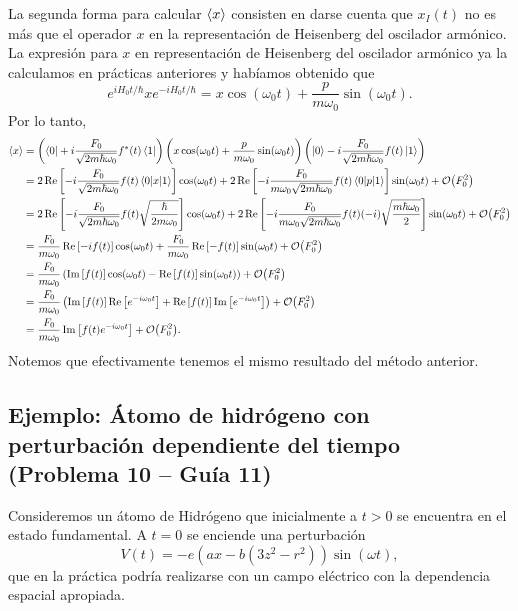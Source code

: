 \documentclass[10pt, a4paper]{article}
\numberwithin{equation}{subsection}
\begin{document}
\bigbreak

La segunda forma para calcular $\expval{x}$ consisten en darse cuenta que
$x_I(t)$ no es más que el operador $x$ en la representación de Heisenberg del
oscilador armónico. La expresión para $x$ en representación de Heisenberg del
oscilador armónico ya la calculamos en prácticas anteriores y habíamos obtenido
que
\begin{equation}
  e^{iH_0t/\hbar}xe^{-iH_0t/\hbar} = x\cos(\omega_0t) +
    \frac{p}{m\omega_0}\sin(\omega_0t).
\end{equation}
Por lo tanto,
\begin{align}
  \expval{x}
  &= \left(\bra{0} + i\frac{F_0}{\sqrt{2m\hbar\omega_0}}f^*(t)\bra{1}\right)
    \left(x\cos(\omega_0t) + \frac{p}{m\omega_0}\sin(\omega_0t)\right)
    \left(\ket{0} - i\frac{F_0}{\sqrt{2m\hbar\omega_0}}f(t)\ket{1}\right)
    \nonumber \\
  &= 2\Re\left[-i\frac{F_0}{\sqrt{2m\hbar\omega_0}}f(t)\matrixel{0}{x}{1}\right]\cos(\omega_0t) +
    2\Re\left[-i\frac{F_0}{m\omega_0\sqrt{2m\hbar\omega_0}}f(t)\matrixel{0}{p}{1}\right]\sin(\omega_0t) +
    \order{F_0^2} \nonumber \\
  &= 2\Re\left[-i\frac{F_0}{\sqrt{2m\hbar\omega_0}}f(t)\sqrt{\frac{\hbar}{2m\omega_0}}\right]\cos(\omega_0t) +
    2\Re\left[-i\frac{F_0}{m\omega_0\sqrt{2m\hbar\omega_0}}f(t)(-i)\sqrt{\frac{m\hbar\omega_0}{2}}\right]\sin(\omega_0t) +
    \order{F_0^2} \nonumber \\
  &= \frac{F_0}{m\omega_0}\Re\left[-if(t)\right]\cos(\omega_0t) +
    \frac{F_0}{m\omega_0}\Re\left[-f(t)\right]\sin(\omega_0t) +
    \order{F_0^2} \nonumber \\
  &= \frac{F_0}{m\omega_0}\left(\Im\left[f(t)\right]\cos(\omega_0t) -
    \Re\left[f(t)\right]\sin(\omega_0t) \right) +
    \order{F_0^2} \nonumber \\
  &= \frac{F_0}{m\omega_0}\left(
    \Im\left[f(t)\right]\Re\left[e^{-i\omega_0t}\right] +
    \Re\left[f(t)\right]\Im\left[e^{-i\omega_0t}\right]\right) +
    \order{F_0^2} \nonumber \\
  &= \frac{F_0}{m\omega_0}\Im\left[f(t)e^{-i\omega_0t}\right] +
    \order{F_0^2}.
\end{align}
Notemos que efectivamente tenemos el mismo resultado del método anterior.

\subsection{Ejemplo: Átomo de hidrógeno con perturbación dependiente del tiempo
  (Problema 10 -- Guía 11)}
Consideremos un átomo de Hidrógeno que inicialmente a $t > 0$ se encuentra en
el estado fundamental. A $t = 0$ se enciende una perturbación
\begin{equation}
  V(t) = -e(ax -b(3z^2 - r^2))\sin(\omega t),
\end{equation}
que en la práctica podría realizarse con un campo eléctrico con la dependencia
espacial apropiada.
\end{document}
